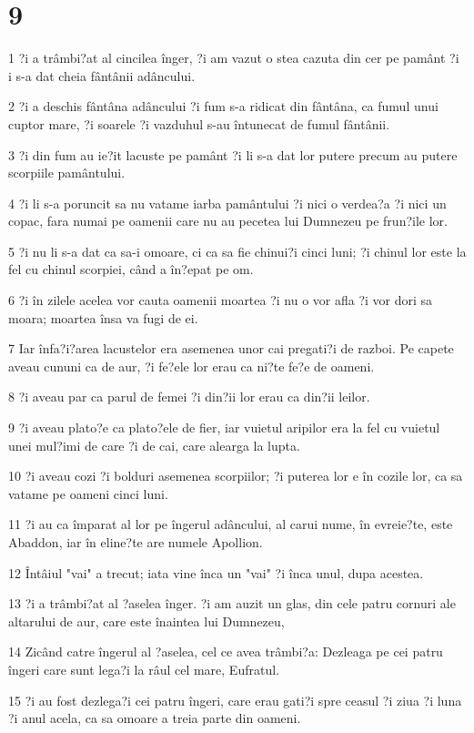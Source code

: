 \chapter{9}

\par 1 ?i a trâmbi?at al cincilea înger, ?i am vazut o stea cazuta din cer pe pamânt ?i i s-a dat cheia fântânii adâncului.
\par 2 ?i a deschis fântâna adâncului ?i fum s-a ridicat din fântâna, ca fumul unui cuptor mare, ?i soarele ?i vazduhul s-au întunecat de fumul fântânii.
\par 3 ?i din fum au ie?it lacuste pe pamânt ?i li s-a dat lor putere precum au putere scorpiile pamântului.
\par 4 ?i li s-a poruncit sa nu vatame iarba pamântului ?i nici o verdea?a ?i nici un copac, fara numai pe oamenii care nu au pecetea lui Dumnezeu pe frun?ile lor.
\par 5 ?i nu li s-a dat ca sa-i omoare, ci ca sa fie chinui?i cinci luni; ?i chinul lor este la fel cu chinul scorpiei, când a în?epat pe om.
\par 6 ?i în zilele acelea vor cauta oamenii moartea ?i nu o vor afla ?i vor dori sa moara; moartea însa va fugi de ei.
\par 7 Iar înfa?i?area lacustelor era asemenea unor cai pregati?i de razboi. Pe capete aveau cununi ca de aur, ?i fe?ele lor erau ca ni?te fe?e de oameni.
\par 8 ?i aveau par ca parul de femei ?i din?ii lor erau ca din?ii leilor.
\par 9 ?i aveau plato?e ca plato?ele de fier, iar vuietul aripilor era la fel cu vuietul unei mul?imi de care ?i de cai, care alearga la lupta.
\par 10 ?i aveau cozi ?i bolduri asemenea scorpiilor; ?i puterea lor e în cozile lor, ca sa vatame pe oameni cinci luni.
\par 11 ?i au ca împarat al lor pe îngerul adâncului, al carui nume, în evreie?te, este Abaddon, iar în eline?te are numele Apollion.
\par 12 Întâiul "vai" a trecut; iata vine înca un "vai" ?i înca unul, dupa acestea.
\par 13 ?i a trâmbi?at al ?aselea înger. ?i am auzit un glas, din cele patru cornuri ale altarului de aur, care este înaintea lui Dumnezeu,
\par 14 Zicând catre îngerul al ?aselea, cel ce avea trâmbi?a: Dezleaga pe cei patru îngeri care sunt lega?i la râul cel mare, Eufratul.
\par 15 ?i au fost dezlega?i cei patru îngeri, care erau gati?i spre ceasul ?i ziua ?i luna ?i anul acela, ca sa omoare a treia parte din oameni.

